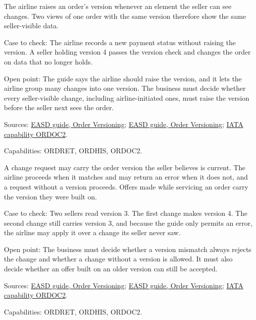 \begin{theorem}
  \label{thm:order-creation-version-tracks-view}
  \notready
  The airline raises an order's version whenever an element the seller can
  see changes. Two views of one order with the same version therefore show
  the same seller-visible data.

  Case to check: The airline records a new payment status without raising
  the version. A seller holding version 4 passes the version check and
  changes the order on data that no longer holds.

  Open point: The guide says the airline should raise the version, and it
  lets the airline group many changes into one version. The business must
  decide whether every seller-visible change, including airline-initiated
  ones, must raise the version before the seller next sees the order.

  Sources: \href{https://standards.atlassian.net/wiki/spaces/EASD/pages/574259659/Order+Versioning}{EASD guide, Order Versioning};
  \href{https://standards.atlassian.net/wiki/spaces/EASD/pages/574259659}{EASD guide, Order Versioning};
  \href{https://retailing.iata.org/armi/docs/ORDOC2/}{IATA capability ORDOC2}.

  Capabilities: ORDRET, ORDHIS, ORDOC2.
\end{theorem}

\begin{definition}
  \label{def:order-creation-stale-version-change}
  A change request may carry the order version the seller believes is
  current. The airline proceeds when it matches and may return an error when
  it does not, and a request without a version proceeds. Offers made while
  servicing an order carry the version they were built on.

  Case to check: Two sellers read version 3. The first change makes version
  4. The second change still carries version 3, and because the guide only
  permits an error, the airline may apply it over a change its seller never
  saw.

  Open point: The business must decide whether a version mismatch always
  rejects the change and whether a change without a version is allowed. It
  must also decide whether an offer built on an older version can still be
  accepted.

  Sources: \href{https://standards.atlassian.net/wiki/spaces/EASD/pages/574259659/Order+Versioning}{EASD guide, Order Versioning};
  \href{https://standards.atlassian.net/wiki/spaces/EASD/pages/574259659}{EASD guide, Order Versioning};
  \href{https://retailing.iata.org/armi/docs/ORDOC2/}{IATA capability ORDOC2}.

  Capabilities: ORDRET, ORDHIS, ORDOC2.
\end{definition}

